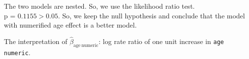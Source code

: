 The two models are nested. So, we use the likelihood ratio test.\\
p = $0.1155 > 0.05$. So, we keep the null hypothesis and conclude that the model with numerified age effect is a better model.

The interpretation of $\widehat{\beta}_{\mathrm{age~numeric}}$: log rate ratio of one unit increase in \texttt{age numeric}.